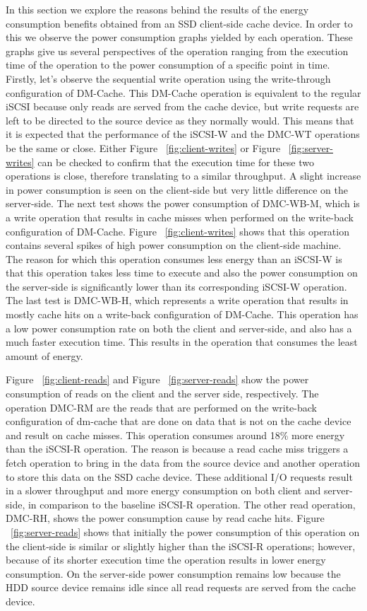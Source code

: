 In this section we explore the reasons behind the results of the energy
consumption benefits obtained from an SSD client-side cache device. In order to
this we observe the power consumption graphs yielded by each operation. These
graphs give us several perspectives of the operation ranging from the execution
time of the operation to the power consumption of a specific point in
time. Firstly, let's observe the sequential write operation using the
write-through configuration of DM-Cache. This DM-Cache operation is equivalent
to the regular iSCSI because only reads are served from the cache device, but
write requests are left to be directed to the source device as they normally
would. This means that it is expected that the performance of the iSCSI-W and
the DMC-WT operations be the same or close. Either Figure
~\ref{fig:client-writes} or Figure ~\ref{fig:server-writes} can be checked to
confirm that the execution time for these two operations is close, therefore
translating to a similar throughput. A slight increase in power consumption is
seen on the client-side but very little difference on the server-side. The next
test shows the power consumption of DMC-WB-M, which is a write operation that
results in cache misses when performed on the write-back configuration of
DM-Cache. Figure ~\ref{fig:client-writes} shows that this operation contains
several spikes of high power consumption on the client-side machine. The reason
for which this operation consumes less energy than an iSCSI-W is that this
operation takes less time to execute and also the power consumption on the
server-side is significantly lower than its corresponding iSCSI-W operation. The
last test is DMC-WB-H, which represents a write operation that results in mostly
cache hits on a write-back configuration of DM-Cache. This operation has a low
power consumption rate on both the client and server-side, and also has a much
faster execution time. This results in the operation that consumes the least
amount of energy.

Figure ~\ref{fig:client-reads} and Figure ~\ref{fig:server-reads} show the power
consumption of reads on the client and the server side, respectively. The
operation DMC-RM are the reads that are performed on the write-back
configuration of dm-cache that are done on data that is not on the cache device
and result on cache misses. This operation consumes around 18\% more energy than
the iSCSI-R operation. The reason is because a read cache miss triggers a fetch
operation to bring in the data from the source device and another operation to
store this data on the SSD cache device. These additional I/O requests result in
a slower throughput and more energy consumption on both client and server-side,
in comparison to the baseline iSCSI-R operation.  The other read operation,
DMC-RH, shows the power consumption cause by read cache hits. Figure
~\ref{fig:server-reads} shows that initially the power consumption of this
operation on the client-side is similar or slightly higher than the iSCSI-R
operations; however, because of its shorter execution time the operation results
in lower energy consumption. On the server-side power consumption remains low
because the HDD source device remains idle since all read requests are served
from the cache device.
